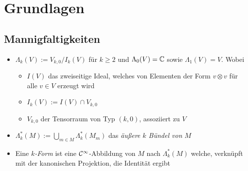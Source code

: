 \chapter{Grundlagen}
\section{Mannigfaltigkeiten}
\begin{comment}
Hier sollen einige Grundlagen über differenzierbare Mannigfaltigkeiten
wiederholt werden. Siehe dazu \cite[1.22ff]{warnerLie}.
\end{comment}
\begin{comment}
\begin{defn} \ccite[Defn 1.22]{warnerLie}
Sei $\psi :M\overset{\cC^\infty}\to N$ eine Abbildung und sei $m\in M$. Das
\emph{Differenzial} von $\psi$ an $m$ ist die lineare Abbildung
$d\psi:M_m\to N_{\psi(m)}$, welche wie folgt definiert ist. ...
\end{defn}
\end{comment}
\begin{comment}
\begin{defn}
... der \emph{Tangentialraum $G_e$ am Element $e$} ist definiert als...
\end{defn}
\end{comment}

\begin{defn}
\begin{itemize}
\item 
{}
$\Lambda_k(V):=V_{k,0}/I_k(V)$ für $k\geq2$ und $\Lambda_0(V)=\mathbb{C}$ sowie
$\Lambda_1(V)=V$. Wobei
\begin{itemize}
\item $I(V)$ das zweiseitige Ideal, welches von Elementen der
Form $v\otimes v$ für alle $v\in V$ erzeugt wird
\item $I_k(V):=I(V)\cap V_{k,0}$
\item $V_{k,0}$ der Tensorraum von Typ $(k,0)$, assoziiert zu $V$ 
\end{itemize}
\item 
{}
$\Lambda_k^*(M):=\underset{m\in M}\bigcup\Lambda_k^*(M_m)$ das \emph{äußere $k$
Bündel von $M$}
\item 
{}
Eine \emph{$k$-Form} ist eine $\mathcal{C}^\infty$-Abbildung von $M$ nach
$\Lambda_k^*(M)$ welche, verknüpft mit der kanonischen Projektion, die
Identität ergibt
\end{itemize}
\end{defn}

